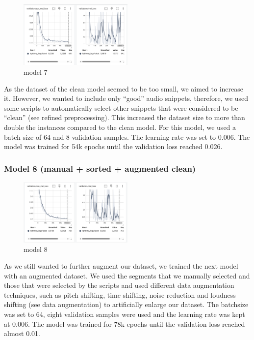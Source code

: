 \documentclass[a4paper]{article}
\begin{document}
	\begin{figure}[htbp]
		\centering
		\includegraphics[width=0.5\textwidth]{graphics/v7_testing.png}
		\caption{model 7}
		\label{fig:bild4}
	\end{figure}
	
	As the dataset of the clean model seemed to be too small, we aimed to increase it. However, we wanted to include only “good” audio snippets, therefore, we used some scripts to automatically select other snippets that were considered to be “clean” (see refined preprocessing). This increased the dataset size to more than double the instances compared to the clean model. For this model, we used a batch size of 64 and 8 validation samples. The learning rate was set to 0.006. The model was trained for 54k epochs until the validation loss reached 0.026.
	
	\subsubsection{Model 8 (manual + sorted + augmented clean)}
	
	\begin{figure}[htbp]
		\centering
		\includegraphics[width=0.5\textwidth]{graphics/v8_testing.png}
		\caption{model 8}
		\label{fig:bild5}
	\end{figure}
	
	As we still wanted to further augment our dataset, we trained the next model with an augmented dataset. We used the segments that we manually selected and those that were selected by the scripts and used different data augmentation techniques, such as pitch shifting, time shifting, noise reduction and loudness shifting (see data augmentation) to artificially enlarge our dataset. The batchsize was set to 64, eight validation samples were used and the learning rate was kept at 0.006. The model was trained for 78k epochs until the validation loss reached almost 0.01.
	
\end{document}
